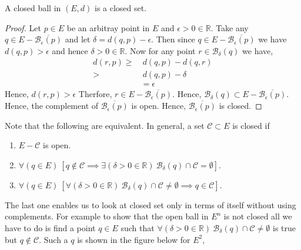 \begin{Theorem}[name= Closed ball is a closed set]
    A closed ball in $(E,d)$ is a closed set.
\end{Theorem}
\begin{proof}
    Let $p \in E$ be an arbitray point in $E$ and $\epsilon > 0 \in \mathbb{R}$. 
    Take any $q \in E - \overline{\mathcal{B}_{\epsilon}(p)}$ and let $\delta = d(q,p) - \epsilon$.
    Then since $q \in  E - \overline{\mathcal{B}_{\epsilon}(p)}$
    we have $d(q,p) > \epsilon$ and hence $\delta > 0 \in \mathbb{R}$. Now for any point $r \in
    \mathcal{B}_{\delta}(q)$ we have,
    \begin{displaymath}
	\begin{aligned}
	    d(r,p) \geq & \ d(q,p) - d(q,r) \\
	    > & \ d(q,p) - \delta \\
	    & = \epsilon
	\end{aligned}
    \end{displaymath}
    Hence, $d(r,p) > \epsilon$ Therfore, $r \in E - \overline{\mathcal{B}_{\epsilon}(p)}$. Hence,
    $\mathcal{B}_{\delta}(q) \subset E - \overline{\mathcal{B}_{\epsilon}(p)}$. Hence, the
    complement of $\overline{\mathcal{B}_{\epsilon}(p)}$ is open. Hence, 
    $\overline{\mathcal{B}_{\epsilon}(p)}$ is closed.
\end{proof}

Note that the following are equivalent. In general, a set $\mathcal{C} \subset E$ is closed if
\begin{enumerate}
    \item $E - \mathcal{C}$ is open.
    \item $\forall \left(q \in E\right) \ \left[ q \not \in \mathcal{C} \implies \exists 
	    \left(\delta > 0 \in \mathbb{R} \right) \ \mathcal{B}_{\delta}(q) \cap 
	    \mathcal{C} = \emptyset \right] $.
    \item $\forall \left(q \in E\right) \ \left[ \forall \left( \delta > 0 \in \mathbb{R}\right) \
	    \mathcal{B}_{\delta}(q) \cap \mathcal{C} \neq \emptyset \implies q \in
	    \mathcal{C}\right]$.
\end{enumerate}
The last one enables us to look at closed set only in terms of itself without using complements. For
example to show that the open ball in $E^n$ is not closed all we have to do is find a point $q \in
E$ such that  $\forall \left( \delta > 0 \in \mathbb{R}\right) \ \mathcal{B}_{\delta}(q) \cap 
\mathcal{C} \neq \emptyset$ is true but $q \not \in \mathcal{C}$. Such a $q$ is shown in the figure
below for $E^2$,



